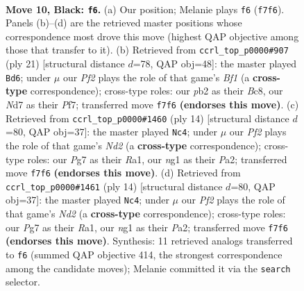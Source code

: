 \documentclass[11pt]{article}
\begin{document}
\clearpage

\begin{figure}[p]\centering
\begin{subfigure}{0.46\textwidth}\centering
\resizebox{\linewidth}{!}{%
\newchessgame
\chessboard[
  setfen={r1bqk2r/pp1n1ppp/2p5/3p2b1/3P4/2N1P3/PP2BPPP/R2QK1NR b KQkq - 1 10},
  showmover=false,
  pgfstyle=straightmove, color=movearrow, markmove={f7-f6}
]}
\caption{}
\end{subfigure}\hfill
\begin{subfigure}{0.46\textwidth}\centering
\resizebox{\linewidth}{!}{%
\newchessgame
\chessboard[
  setfen={r1bqkb1r/1p3ppp/p3p3/3n4/3N4/2P3B1/PP2BPPP/R2QK2R b KQkq - 2 11},
  showmover=false,
  pgfstyle=straightmove, color=movearrow, markmove={f8-d6}
]}
\caption{}
\end{subfigure}
\\[4pt]
\begin{subfigure}{0.46\textwidth}\centering
\resizebox{\linewidth}{!}{%
\newchessgame
\chessboard[
  setfen={r1bqkb1r/pp3ppp/2p2n2/4p3/4P3/3B4/PPPN1PPP/R1BQK2R w KQkq - 0 8},
  showmover=false,
  pgfstyle=straightmove, color=movearrow, markmove={d2-c4}
]}
\caption{}
\end{subfigure}\hfill
\begin{subfigure}{0.46\textwidth}\centering
\resizebox{\linewidth}{!}{%
\newchessgame
\chessboard[
  setfen={r1bqkb1r/pp3ppp/2p2n2/4p3/4P3/3B4/PPPN1PPP/R1BQK2R w KQkq - 0 8},
  showmover=false,
  pgfstyle=straightmove, color=movearrow, markmove={d2-c4}
]}
\caption{}
\end{subfigure}
\caption{\textbf{Move 10, Black: \texttt{f6}.} (a) Our position; Melanie plays \texttt{f6} (\texttt{f7f6}). Panels (b)--(d) are the retrieved master positions whose correspondence most drove this move (highest QAP objective among those that transfer to it). (b) Retrieved from \texttt{ccrl\_top\_p0000\#907} (ply 21) [structural distance $d$=78, QAP obj=48]: the master played \texttt{Bd6}; under $\mu$ our \emph{Pf2} plays the role of that game's \emph{Bf1} (a \textbf{cross-type} correspondence); cross-type roles: our \emph{p}b2 as their \emph{B}c8, our \emph{N}d7 as their \emph{P}f7; transferred move \texttt{f7f6} \textbf{(endorses this move)}. (c) Retrieved from \texttt{ccrl\_top\_p0000\#1460} (ply 14) [structural distance $d$=80, QAP obj=37]: the master played \texttt{Nc4}; under $\mu$ our \emph{Pf2} plays the role of that game's \emph{Nd2} (a \textbf{cross-type} correspondence); cross-type roles: our \emph{P}g7 as their \emph{R}a1, our \emph{n}g1 as their \emph{P}a2; transferred move \texttt{f7f6} \textbf{(endorses this move)}. (d) Retrieved from \texttt{ccrl\_top\_p0000\#1461} (ply 14) [structural distance $d$=80, QAP obj=37]: the master played \texttt{Nc4}; under $\mu$ our \emph{Pf2} plays the role of that game's \emph{Nd2} (a \textbf{cross-type} correspondence); cross-type roles: our \emph{P}g7 as their \emph{R}a1, our \emph{n}g1 as their \emph{P}a2; transferred move \texttt{f7f6} \textbf{(endorses this move)}. Synthesis: 11 retrieved analogs transferred to \texttt{f6} (summed QAP objective 414, the strongest correspondence among the candidate moves); Melanie committed it via the \texttt{search} selector.}
\label{fig:thought-m19}
\end{figure}
\end{document}
